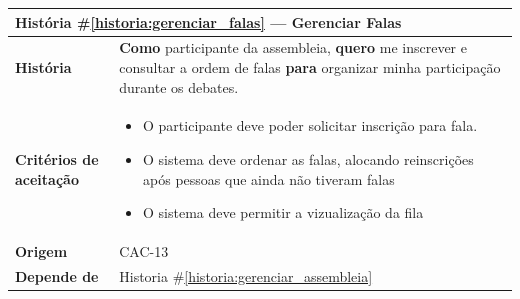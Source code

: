 \documentclass[12pt,a4paper]{article}
\newcounter{historia}
\begin{document}
\label{historia:gerenciar_falas}
\begin{table}[H]
    \centering
    \begin{tabular}{|m{4.5cm} | m{11cm}|}
    \hline
    
    \multicolumn{2}{|l|}{\textbf{História \#\ref{historia:gerenciar_falas} --- Gerenciar Falas}} \\
    
    \hline  \textbf{História} &
    \textbf{Como} participante da assembleia, \newline
    \textbf{quero} me inscrever e consultar a ordem de falas \newline  
    \textbf{para} organizar minha participação durante os debates. \\

    \textbf{Critérios de aceitação} &
    \begin{itemize}
        \item{O participante deve poder solicitar inscrição para fala.}
        \item{O sistema deve ordenar as falas, alocando reinscrições após pessoas que ainda não tiveram falas}
        \item{O sistema deve permitir a vizualização da fila}
    \end{itemize}\\
    
    \textbf{Origem} &
    CAC-13\\
    
    \textbf{Depende de} &
     Historia \#\ref{historia:gerenciar_assembleia} \\
    \hline
    \end{tabular}
\end{table}
\end{document}

